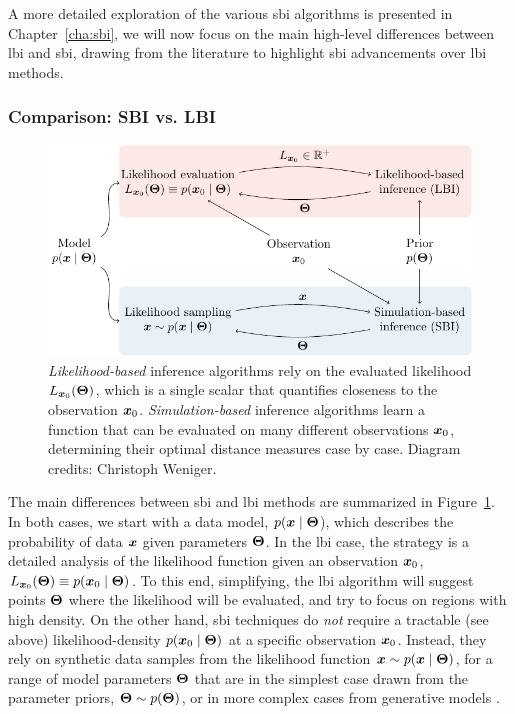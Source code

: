 A more detailed exploration of the various \gls*{sbi} algorithms is presented in Chapter~\ref{cha:sbi}, we will now focus on the main high-level differences between \gls*{lbi} and \gls*{sbi}, drawing from the literature to highlight \gls*{sbi} advancements over \gls*{lbi} methods.

\subsubsection{Comparison: SBI vs. LBI}

\begin{figure}
	\centering
	\includegraphics[width=\linewidth]{TikZ/lbi_vs_sbi.pdf}
	\caption{\emph{Likelihood-based} inference algorithms rely on the evaluated likelihood  $L_{\bm{x}_0}(\bm{\Theta}) $, which is a single scalar that quantifies closeness to the observation $\bm{x}_0$. \emph{Simulation-based} inference algorithms learn a function that can be evaluated on many different observations $\bm{x}_0$, determining their optimal distance measures case by case. Diagram credits: Christoph Weniger.}
	\label{fig:SBIvsLBI}
\end{figure}

The main differences between \gls*{sbi} and \gls*{lbi} methods are summarized in Figure~\ref{fig:SBIvsLBI}. In both cases, we start with a data model, $p(\bm{x}\mid\bm{\Theta}$), which describes the probability of data $\bm{x}$ given parameters $\bm{\Theta}$. In the \gls*{lbi} case, the strategy is a detailed analysis of the likelihood function given an observation $\bm{x}_0$, $L_{\bm{x}_0}(\bm{\Theta})\equiv p(\bm{x}_0\mid\bm{\Theta})$. To this end, simplifying, the \gls*{lbi} algorithm will suggest points $\bm{\Theta}$ where the likelihood will be evaluated, and try to focus on regions with high density. On the other hand, \gls*{sbi} techniques do \emph{not} require a tractable (see above) likelihood-density $p(\bm{x}_0\mid\bm{\Theta})$ at a specific observation $\bm{x}_0$. Instead, they rely on synthetic data samples from the likelihood function $\bm{x} \sim p(\bm{x}\mid\bm{\Theta})$, for a range of model parameters $\bm{\Theta}$ that are in the simplest case drawn from the parameter priors, $\bm{\Theta} \sim p(\bm{\Theta})$, or in more complex cases from generative models \cite[\eg][]{Karchev:2022aa}. %


